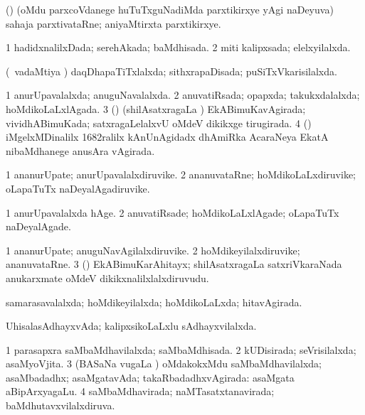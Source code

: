 \noindent 
\gl{\pagu}
\expl{}
\bmng
{} (\mavi) (oMdu parxcoVdanege huTuTxguNadiMda parxtikirxye yAgi naDeyuva) sahaja parxtivataRne; aniyaMtirxta parxtikirxye. 
\emng
\eentry

\bentry
{} 
\gl{\gu}
\expl{}
\bmng
\bnum
\num{1} hadidxnalilxDada; serehAkada; baMdhisada. 
\num{2} miti kalipxsada; elelxyilalxda. 
\enum
\emng
\eentry

\bentry
{} 
\gl{\gu}
\expl{}
\bmng
 (\kanmu\ vadaMtiya \vi) daqDhapaTiTxlalxda; sithxrapaDisada; puSiTxVkarisilalxda. 
\emng
\eentry

\bentry
{} 
\gl{\gu}
\expl{}
\bmng
\bnum
\num{1} anurUpavalalxda; anuguNavalalxda. 
\num{2} anuvatiRsada; opapxda; takukxdalalxda; hoMdikoLaLxlAgada. 
\num{3} (\BUvi) (shilAsatxragaLa \vi) EkABimuKavAgirada; vividhABimuKada; satxragaLelalxvU oMdeV dikikxge tirugirada. 
\num{4} (\ca) iMgelxMDinalilx 1682ralilx kAnUnAgidadx dhAmiRka AcaraNeya EkatA nibaMdhanege anusAra vAgirada. 
\enum
\emng
\eentry

\bentry
{} 
\gl{\nA}
\expl{}
\bmng
\bnum
\num{1} ananurUpate; anurUpavalalxdiruvike. 
\num{2} ananuvataRne; hoMdikoLaLxdiruvike; oLapaTuTx naDeyalAgadiruvike. 
\enum
\emng
\eentry

\bentry
{} 
\gl{\kirxvi}
\expl{}
\bmng
\bnum
\num{1} anurUpavalalxda hAge. 
\num{2} anuvatiRsade; hoMdikoLaLxlAgade; oLapaTuTx naDeyalAgade. 
\enum
\emng
\eentry

\bentry
{} 
\gl{\nA}
\expl{}
\bmng
\bnum
\num{1} ananurUpate; anuguNavAgilalxdiruvike. 
\num{2} hoMdikeyilalxdiruvike; ananuvataRne. 
\num{3} (\BUvi) EkABimuKarAhitayx; shilAsatxragaLa satxriVkaraNada anukarxmate oMdeV dikikxnalilxlalxdiruvudu. 
\enum
\emng
\eentry

\bentry
{} 
\gl{\gu}
\expl{}
\bmng
 samarasavalalxda; hoMdikeyilalxda; hoMdikoLaLxda; hitavAgirada. 
\emng
\eentry

\bentry
{} 
\gl{\gu}
\expl{}
\bmng
UhisalasAdhayxvAda; kalipxsikoLaLxlu sAdhayxvilalxda. 
\emng
\eentry

\bentry
{} 
\gl{\gu}
\expl{}
\bmng
\bnum
\num{1} parasapxra saMbaMdhavilalxda; saMbaMdhisada. 
\num{2} kUDisirada; seVrisilalxda; asaMyoVjita. 
\num{3} (BASaNa \mo vugaLa \vi) oMdakokxMdu saMbaMdhavilalxda; asaMbadadhx; asaMgatavAda; takaRbadadhxvAgirada:  asaMgata aBipArxyagaLu. 
\num{4} saMbaMdhavirada; naMTasatxtanavirada; baMdhutavxvilalxdiruva. 
\enum
\emng
\eentry

